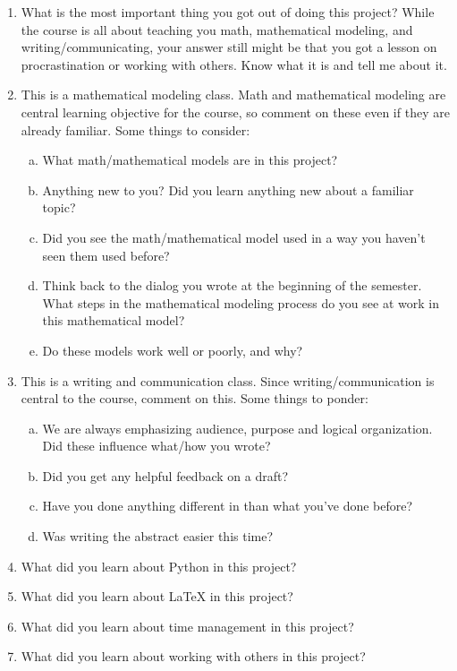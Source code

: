 \documentclass[english]{article}
\newcommand{\LaTeXs}{\LaTeX{\/} }
\begin{document}
\begin{enumerate}\itemsep0pt
\item What is the most important thing you got out of doing this
  project?  While the course is all about teaching you math,
  mathematical modeling, and writing/communicating, your answer still
  might be that you got a lesson on procrastination or working with
  others.  Know what it is and tell me about it.
\item This is a mathematical modeling class. Math and mathematical modeling are central
  learning objective for the course, so comment on these even if they
  are already familiar.  Some things to consider:
\begin{enumerate}[a)]\itemsep0pt
\item What math/mathematical models are in this project?
\item Anything new to you? Did you learn anything new about a familiar topic?
\item Did you see the math/mathematical model used in a way you haven't seen them used before?
\item Think back to the dialog you wrote at the beginning of the
  semester.  What steps in the mathematical modeling process do you
  see at work in this mathematical model?
\item Do these models work well or poorly, and why?  
\end{enumerate}
\item This is a writing and communication class. Since
  writing/communication is central to the course, comment on this.
  Some things to ponder:
\begin{enumerate}[a)]\itemsep0pt
\item  We are always emphasizing audience, purpose and logical organization.  Did these influence what/how you wrote?
\item Did you get any helpful feedback on a draft?
\item Have you done anything different in than
  what you've done before?  
\item Was writing the abstract easier this time?  
\end{enumerate}
\item What did you learn about Python in this project?
\item What did you learn about \LaTeXs in this project?
\item What did you learn about time management in this project?
\item What did you learn about working with others in this project?
\end{enumerate}
\end{document}
